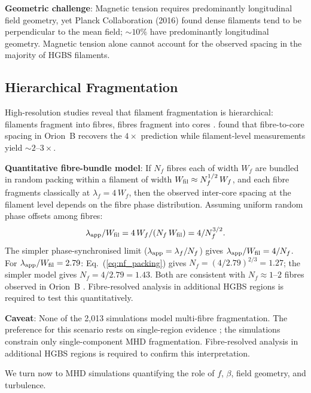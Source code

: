 \documentclass[twoside,twocolumn]{mnras}
\begin{document}
\textbf{Geometric challenge}: Magnetic tension requires predominantly longitudinal field
geometry, yet Planck Collaboration (2016) found dense filaments tend to be perpendicular
to the mean field; ${\sim}10\%$ have predominantly longitudinal geometry. Magnetic tension
alone cannot account for the observed spacing in the majority of HGBS filaments.

\subsection{Hierarchical Fragmentation}
\label{sec:hierarchical}

High-resolution studies reveal that filament fragmentation is hierarchical: filaments
fragment into fibres, fibres fragment into cores \citep{Hacar2013, Hacar2018}.
\citet{Yang2024} found that fibre-to-core spacing in Orion~B recovers the $4\times$
prediction while filament-level measurements yield ${\sim}2$--$3\times$.

\textbf{Quantitative fibre-bundle model}: If $N_f$ fibres each of width $W_f$ are
bundled in random packing within a filament of width $W_{\rm fil} \approx N_f^{1/2}\,W_f$,
and each fibre fragments classically at $\lambda_f = 4\,W_f$, then the
observed inter-core spacing at the filament level depends on the fibre phase
distribution. Assuming uniform random phase offsets among fibres:
\begin{equation}
\lambda_{\rm app}/W_{\rm fil} = 4\,W_f/(N_f\,W_{\rm fil}) = 4/N_f^{3/2}.
\label{eq:nf_packing}
\end{equation}
The simpler phase-synchronised limit ($\lambda_{\rm app} = \lambda_f/N_f$) gives
$\lambda_{\rm app}/W_{\rm fil} = 4/N_f$.
For $\lambda_{\rm app}/W_{\rm fil} = 2.79$: Eq.~(\ref{eq:nf_packing}) gives
$N_f = (4/2.79)^{2/3} = 1.27$; the simpler model gives $N_f = 4/2.79 = 1.43$. Both
are consistent with $N_f \approx 1$--$2$ fibres observed in Orion~B \citep{Hacar2018}.
Fibre-resolved analysis in additional HGBS regions is required to test this
quantitatively.

\textbf{Caveat}: None of the 2,013 simulations model multi-fibre fragmentation.
The preference for this scenario rests on single-region evidence \citep{Yang2024};
the simulations constrain only single-component MHD fragmentation. Fibre-resolved
analysis in additional HGBS regions is required to confirm this interpretation.

We turn now to MHD simulations quantifying the role of $f$, $\beta$, field geometry,
and turbulence.
\end{document}
